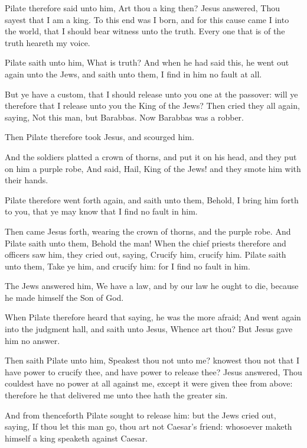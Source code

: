 \Verse Pilate therefore said unto him, Art thou a king then? Jesus answered, Thou sayest that I am a king. To this end was I born, and for this cause came I into the world, that I should bear witness unto the truth. Every one that is of the truth heareth my voice.

\Verse Pilate saith unto him, What is truth? And when he had said this, he went out again unto the Jews, and saith unto them, I find in him no fault at all.

\Verse But ye have a custom, that I should release unto you one at the passover: will ye therefore that I release unto you the King of the Jews?  \Verse Then cried they all again, saying, Not this man, but Barabbas. Now Barabbas was a robber.


\Chapter
\Verse Then Pilate therefore took Jesus, and scourged him.

\Verse And the soldiers platted a crown of thorns, and put it on his head, and they put on him a purple robe, \Verse And said, Hail, King of the Jews! and they smote him with their hands.

\Verse Pilate therefore went forth again, and saith unto them, Behold, I bring him forth to you, that ye may know that I find no fault in him.

\Verse Then came Jesus forth, wearing the crown of thorns, and the purple robe. And Pilate saith unto them, Behold the man!  \Verse When the chief priests therefore and officers saw him, they cried out, saying, Crucify him, crucify him. Pilate saith unto them, Take ye him, and crucify him: for I find no fault in him.

\Verse The Jews answered him, We have a law, and by our law he ought to die, because he made himself the Son of God.

\Verse When Pilate therefore heard that saying, he was the more afraid; \Verse And went again into the judgment hall, and saith unto Jesus, Whence art thou? But Jesus gave him no answer.

\Verse Then saith Pilate unto him, Speakest thou not unto me? knowest thou not that I have power to crucify thee, and have power to release thee?  \Verse Jesus answered, Thou couldest have no power at all against me, except it were given thee from above: therefore he that delivered me unto thee hath the greater sin.

\Verse And from thenceforth Pilate sought to release him: but the Jews cried out, saying, If thou let this man go, thou art not Caesar's friend: whosoever maketh himself a king speaketh against Caesar.

